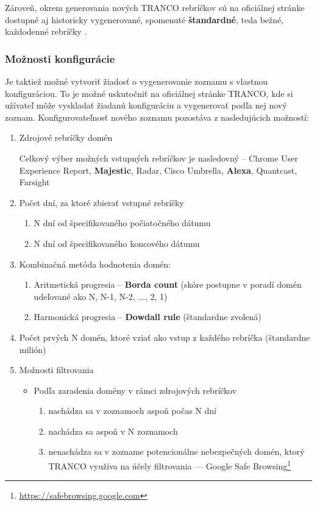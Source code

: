 Zároveň, okrem generovania nových TRANCO rebríčkov sú na oficiálnej stránke dostupné aj historicky vygenerované, spomenuté \textbf{štandardné}, teda bežné, každodenné rebríčky \cite{tranco-homepage}.

\subsubsection{Možnosti konfigurácie}
\label{tranco-config}

Je taktiež možné vytvoriť žiadosť o vygenerovanie zoznamu s vlastnou konfiguráciou. 
To je možné uskutočniť na oficiálnej stránke TRANCO,
kde si užívateľ môže vyskladať žiadanú konfiguráciu a vygenerovať podľa nej nový zoznam.
Konfigurovateľnosť nového zoznamu pozostáva z nasledujúcich možností: \cite{tranco-config}
\begin{enumerate}
    \item Zdrojové rebríčky domén
    
    Celkový výber možných vstupných rebríčkov je nasledovný -- Chrome User Experience Report, \textbf{Majestic}, Radar, Cisco Umbrella, \textbf{Alexa}, Quantcast, Farsight
    
    \item Počet dní, za ktoré zbierať vstupné rebríčky
    \begin{enumerate}
        \item N dní od špecifikovaného počiatočného dátumu
        \item N dní od špecifikovaného koncového dátumu
    \end{enumerate}

    \item Kombinačná metóda hodnotenia domén:
    \begin{enumerate}
        \item Aritmetická progresia -- \textbf{Borda count} (skóre postupne v poradí domén udeľované ako N, N-1, N-2, ..., 2, 1)
        \item Harmonická progresia -- \textbf{Dowdall rule} (štandardne zvolená)
    \end{enumerate}

    \item Počet prvých N domén, ktoré vziať ako vstup z každého rebríčka (štandardne milión)

    \item Možnosti filtrovania
    \begin{itemize}
        \item Podľa zaradenia domény v rámci zdrojových rebríčkov
        \begin{enumerate}
            \item nachádza sa v zoznamoch aspoň počas N dní
            \item nachádza sa aspoň v N zoznamoch
            \item nenachádza sa v zozname potencionálne nebezpečných domén, ktorý TRANCO využíva na účely filtrovania --- Google Safe Browsing\footnote{\href{https://safebrowsing.google.com}{https://safebrowsing.google.com}}
        \end{enumerate}


\end{itemize}
\end{enumerate}
